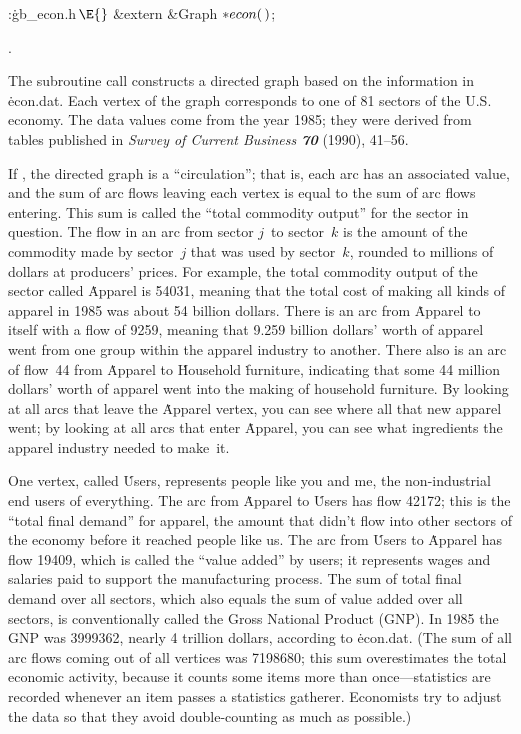 \Y\B\4:\.{gb\_econ.h\,}\X${}\E{}$\6
\&{extern} \&{Graph} ${}{*}\\{econ}(\,){}$;\par
{}.\fi

The subroutine call 
constructs a directed graph based on the information in \.{econ.dat}.
Each vertex of the graph corresponds to one of 81 sectors of the U.S.
economy. The data values come from the year 1985; they were derived from
tables published in {\sl Survey of Current Business\/ \bf70} (1990), 41--56.

If , the directed graph is a
``circulation'';
that is, each arc has an associated  value, and
the sum of arc flows leaving each vertex is equal to the
sum of arc flows entering. This sum is called the ``total commodity output''
for the sector in question. The flow in an arc from sector $j$~to
sector~$k$ is the amount of the commodity made by sector~$j$ that was
used by sector~$k$, rounded to millions of dollars at producers' prices.
For example, the total commodity output of the sector called \.{Apparel}
is 54031, meaning that the total cost of making all kinds of apparel in
1985 was about 54 billion dollars. There is an arc from \.{Apparel} to
itself with a flow of 9259, meaning that 9.259 billion dollars' worth
of apparel went from one group within the apparel industry to another.
There also is an arc of flow~44 from \.{Apparel} to \.{Household}
\.{furniture}, indicating that some 44 million dollars' worth of apparel
went into the making of household furniture. By looking at all
arcs that leave the \.{Apparel} vertex, you can see where all that
new apparel went; by looking at all arcs that enter \.{Apparel}, you can
see what ingredients the apparel industry needed to make~it.

One vertex, called \.{Users}, represents people like you and me, the
non-industrial end users of everything. The arc from \.{Apparel} to
\.{Users} has flow 42172; this is the ``total final demand'' for
apparel, the amount that didn't flow into other sectors of the economy
before it reached people like us. The arc from \.{Users} to \.{Apparel}
has flow 19409, which is called the ``value added'' by users; it
represents wages and salaries paid to support the manufacturing
process. The sum of total final demand over all sectors, which also
equals the sum of value added over all sectors, is conventionally
called the Gross National Product (GNP). In 1985 the GNP was 3999362,
nearly 4 trillion dollars, according to \.{econ.dat}. (The sum of all
arc flows coming out of all vertices was 7198680; this sum
overestimates the total economic activity, because it counts some
items more than once---statistics are recorded whenever an item
passes a statistics gatherer. Economists try to adjust the data so that
they avoid double-counting as much as possible.)

